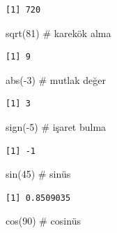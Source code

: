 \documentclass[
  letterpaper,
  DIV=11,
  numbers=noendperiod]{scrreprt}
\newenvironment{Shaded}{\begin{snugshade}}{\end{snugshade}}
\newcommand{\CommentTok}[1]{\textcolor[rgb]{0.37,0.37,0.37}{#1}}
\newcommand{\DecValTok}[1]{\textcolor[rgb]{0.68,0.00,0.00}{#1}}
\newcommand{\FunctionTok}[1]{\textcolor[rgb]{0.28,0.35,0.67}{#1}}
\newcommand{\NormalTok}[1]{\textcolor[rgb]{0.00,0.23,0.31}{#1}}
\newcommand{\SpecialCharTok}[1]{\textcolor[rgb]{0.37,0.37,0.37}{#1}}
\begin{document}
\begin{verbatim}
[1] 720
\end{verbatim}

\begin{Shaded}
\begin{Highlighting}[]
\FunctionTok{sqrt}\NormalTok{(}\DecValTok{81}\NormalTok{) }\CommentTok{\# karekök alma }
\end{Highlighting}
\end{Shaded}

\begin{verbatim}
[1] 9
\end{verbatim}

\begin{Shaded}
\begin{Highlighting}[]
\FunctionTok{abs}\NormalTok{(}\SpecialCharTok{{-}}\DecValTok{3}\NormalTok{) }\CommentTok{\# mutlak değer }
\end{Highlighting}
\end{Shaded}

\begin{verbatim}
[1] 3
\end{verbatim}

\begin{Shaded}
\begin{Highlighting}[]
\FunctionTok{sign}\NormalTok{(}\SpecialCharTok{{-}}\DecValTok{5}\NormalTok{) }\CommentTok{\# işaret bulma }
\end{Highlighting}
\end{Shaded}

\begin{verbatim}
[1] -1
\end{verbatim}

\begin{Shaded}
\begin{Highlighting}[]
\FunctionTok{sin}\NormalTok{(}\DecValTok{45}\NormalTok{) }\CommentTok{\# sinüs }
\end{Highlighting}
\end{Shaded}

\begin{verbatim}
[1] 0.8509035
\end{verbatim}

\begin{Shaded}
\begin{Highlighting}[]
\FunctionTok{cos}\NormalTok{(}\DecValTok{90}\NormalTok{) }\CommentTok{\# cosinüs }
\end{Highlighting}
\end{Shaded}
\end{document}

